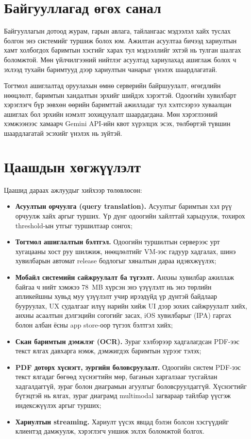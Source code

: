 \documentclass[../main.tex]{subfiles}
\begin{document}
\section*{Байгууллагад өгөх санал}

Байгууллагын дотоод журам, гарын авлага, тайлангаас мэдээлэл хайх туслах
болгон энэ системийг туршиж болох юм. Ажилтан асуултаа бичээд хариултын
хамт холбогдох баримтын хэсгийг харах тул мэдээллийг эхтэй нь тулган
шалгах боломжтой. Мөн үйлчилгээний нийтлэг асуултад хариулахад ашиглаж
болох ч эхлээд тухайн баримтууд дээр хариултын чанарыг үнэлэх шаардлагатай.

Тогтмол ашиглалтад оруулахын өмнө серверийн байршуулалт, өгөгдлийн
нөөцлөлт, баримтын хандалтын эрхийг шийдэх хэрэгтэй. Одоогийн хувилбарт
хэрэглэгч бүр зөвхөн өөрийн баримттай ажилладаг тул хэлтсээрээ хуваалцан
ашиглах бол эрхийн нэмэлт зохицуулалт шаардагдана. Мөн хэрэглээний
хэмжээнээс хамаарч Gemini API-ийн квот хүрэлцэх эсэх, төлбөртэй түвшин
шаардлагатай эсэхийг үнэлэх нь зүйтэй.

\section*{Цаашдын хөгжүүлэлт}

Цаашид дараах ажлуудыг хийхээр төлөвлөсөн:

\begin{itemize}
\item \textbf{Асуултын орчуулга (query translation).} Асуултыг баримтын
хэл рүү орчуулж хайх аргыг турших. Үр дүнг одоогийн хайлттай харьцуулж,
тохирох threshold-ын утгыг туршилтаар сонгох;
\item \textbf{Тогтмол ашиглалтын бэлтгэл.} Одоогийн туршилтын серверээс
урт хугацааны хост руу шилжиж, нөөцлөлтийг VM-ээс гадуур хадгалах,
шинэ хувилбарын автомат release бодлогыг хяналтын дараа идэвхжүүлэх;
\item \textbf{Мобайл системийн сайжруулалт ба түгээлт.} Анхны хувилбар
ажиллаж байгаа ч нийт хэмжээ 78~MB хүрсэн энэ үзүүлэлт нь энэ төрлийн
апликейшны хувьд муу үзүүлэлт учир ирээдүйд үр дүнтэй байдлаар бууруулах, UX
судалгааг илүү нарийн хийж UI дээр зохих сайжруулалт хийх, анхны асаалтын
дэлгэцийн согогийг засах, iOS хувилбарыг (IPA) гаргах болон албан ёсны app
store-оор түгээх бэлтгэл хийх;
\item \textbf{Скан баримтын дэмжлэг (OCR).} Зураг хэлбэрээр хадгалагдсан
PDF-ээс текст ялгах давхарга нэмж, дэмжигдэх баримтын хүрээг тэлэх;
\item \textbf{PDF доторх хүснэгт, зургийн боловсруулалт.}
Одоогийн систем PDF-ээс текст ялгадаг бөгөөд хүснэгтийн мөр, баганын
харгалзааг тусгайлан хадгалдаггүй, зураг болон диаграмын агуулгыг
боловсруулдаггүй. Хүснэгтийг бүтэцтэй нь ялгах, зураг диаграмд multimodal
загвараар тайлбар үүсгэж индексжүүлэх аргыг турших;
\item \textbf{Хариултын streaming.} Хариулт үүсэх явцад бэлэн болсон
хэсгүүдийг клиентэд дамжуулж, хэрэглэгч уншиж эхлэх боломжтой болгох.
\end{itemize}
\end{document}
